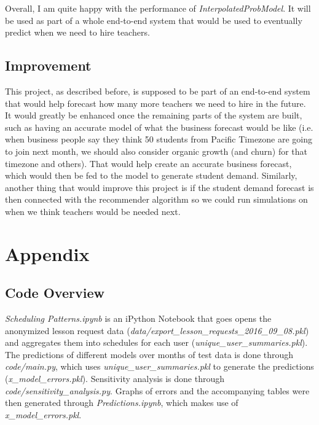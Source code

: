 \documentclass[oneside]{article}
\begin{document}
Overall, I am quite happy with the performance of \emph{InterpolatedProbModel}.
It will be used as part of a whole end-to-end system that would be used to
eventually predict when we need to hire teachers.

\subsection{Improvement}

This project, as described before, is supposed to be part of an end-to-end
system that would help forecast how many more teachers we need to hire in the
future. It would greatly be enhanced once the remaining parts of the system are
built, such as having an accurate model of what the business forecast would be
like (i.e. when business people say they think 50 students from Pacific
Timezone are going to join next month, we should also consider organic growth
(and churn) for that timezone and others). That would help create an accurate
business forecast, which would then be fed to the model to generate student
demand. Similarly, another thing that would improve this project is if the
student demand forecast is then connected with the recommender algorithm so we
could run simulations on when we think teachers would be needed next.

\section{Appendix}

\subsection{Code Overview}

\emph{Scheduling Patterns.ipynb} is an iPython Notebook that goes opens the
anonymized lesson request data
(\emph{data/export\_lesson\_requests\_2016\_09\_08.pkl}) and aggregates them
into schedules for each user (\emph{unique\_user\_summaries.pkl}). The
predictions of different models over months of test data is done through
\emph{code/main.py}, which uses \emph{unique\_user\_summaries.pkl} to generate
the predictions (\emph{x\_model\_errors.pkl}). Sensitivity analysis is done
through \emph{code/sensitivity\_analysis.py}. Graphs of errors and the
accompanying tables were then generated through \emph{Predictions.ipynb}, which
makes use of \emph{x\_model\_errors.pkl}.



\end{document}
